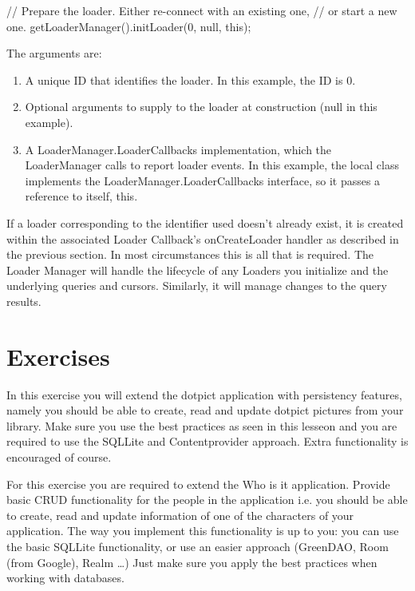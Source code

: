\begin{android}
// Prepare the loader.  Either re-connect with an existing one,
// or start a new one.
getLoaderManager().initLoader(0, null, this);      
\end{android}
The arguments are:
\begin{enumerate}
	\item A unique ID that identifies the loader. In this example, the ID is 0.
	\item Optional arguments to supply to the loader at construction (null in this example).
	\item A LoaderManager.LoaderCallbacks implementation, which the LoaderManager calls to report loader events. In this example, the local class implements the LoaderManager.LoaderCallbacks interface, so it passes a reference to itself, this.
\end{enumerate}

If a loader corresponding to the identifier used doesn’t already exist, it is created within the associated Loader Callback’s onCreateLoader handler as described in the previous section. In most circumstances this is all that is required. The Loader Manager will handle the lifecycle of any Loaders you initialize and the underlying queries and cursors. Similarly, it will manage changes to the query results.

\newpage
\section{Exercises}

\begin{exercise}
	In this exercise you will extend the dotpict application with persistency features, namely you should be able to create, read and update dotpict pictures from your library. Make sure you use the best practices as seen in this lesseon and you are required to use the SQLLite and Contentprovider approach. Extra functionality is encouraged of course.
\end{exercise}

\begin{exercise}
	For this exercise you are required to extend the Who is it application. Provide basic CRUD functionality for the people in the application i.e. you should be able to create, read and update information of one of the characters of your application. The way you implement this functionality is up to you: you can use the basic SQLLite functionality, or use an easier approach (GreenDAO, Room (from Google), Realm \dots) Just make sure you apply the best practices when working with databases. 
\end{exercise}